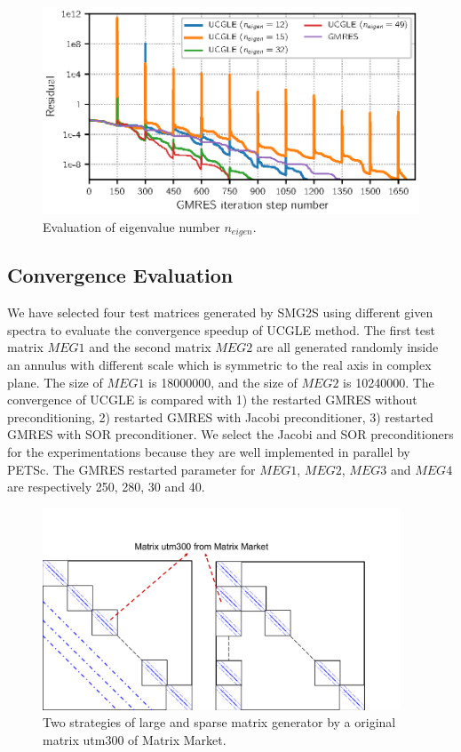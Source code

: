 \begin{figure}[htbp]
	\centering
	\includegraphics[width=6.2in]{fig/conv_eigenvalues.eps}
	\caption{Evaluation of eigenvalue number $n_{eigen}$.}
	\label{fig:vals}
\end{figure}

\subsection{Convergence Evaluation}

We have selected four test matrices generated by SMG2S using different given spectra to evaluate the convergence speedup of UCGLE method. The first test matrix $MEG1$ and the second matrix $MEG2$ are all generated randomly inside an annulus with different scale which is symmetric to the real axis in complex plane. The size of $MEG1$ is \num[round-precision=2,round-mode=figures]{18000000}, and the size of $MEG2$ is \num[round-precision=4,round-mode=figures]{10240000}. The convergence of UCGLE is compared with 1) the restarted GMRES without preconditioning, 2) restarted GMRES with Jacobi preconditioner, 3) restarted GMRES with SOR preconditioner. We select the Jacobi and SOR preconditioners for the experimentations because they are well implemented in parallel by PETSc. The GMRES restarted parameter for $MEG1$, $MEG2$, $MEG3$ and $MEG4$ are respectively 250, 280, 30 and 40.

\begin{figure}[t]
	\centering
	\includegraphics[width=4.2in]{fig/matrix_generator.pdf}
	\caption{Two strategies of large and sparse matrix generator by a original matrix utm300 of Matrix Market.}
	\label{fig:matrix}
\end{figure}


